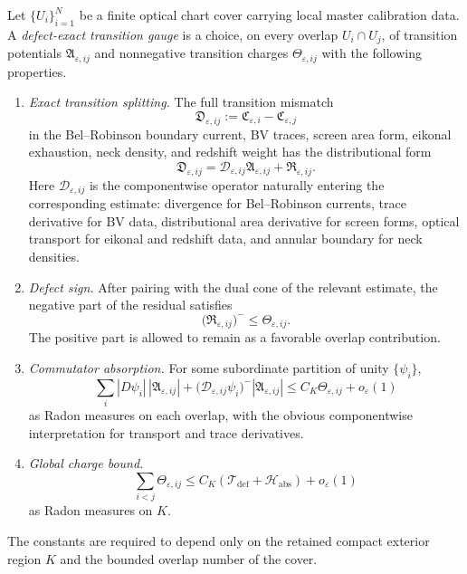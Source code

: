 \begin{definition}\label{def:DefectExactTransitionGauge}
Let $\{U_i\}_{i=1}^N$ be a finite optical chart cover carrying local master calibration data. A \emph{defect-exact transition gauge} is a choice, on every overlap $U_i\cap U_j$, of transition potentials $\mathfrak A_{\varepsilon,ij}$ and nonnegative transition charges $\Theta_{\varepsilon,ij}$ with the following properties.
\begin{enumerate}
    \item \emph{Exact transition splitting.} The full transition mismatch
    \[
        \mathfrak D_{\varepsilon,ij}
        :=
        \mathfrak C_{\varepsilon,i}-\mathfrak C_{\varepsilon,j}
    \]
    in the Bel--Robinson boundary current, BV traces, screen area form, eikonal exhaustion, neck density, and redshift weight has the distributional form
    \[
        \mathfrak D_{\varepsilon,ij}
        =
        \mathscr D_{\varepsilon,ij}\mathfrak A_{\varepsilon,ij}
        +
        \mathfrak R_{\varepsilon,ij}.
    \]
    Here $\mathscr D_{\varepsilon,ij}$ is the componentwise operator naturally entering the corresponding estimate: divergence for Bel--Robinson currents, trace derivative for BV data, distributional area derivative for screen forms, optical transport for eikonal and redshift data, and annular boundary for neck densities.
    \item \emph{Defect sign.} After pairing with the dual cone of the relevant estimate, the negative part of the residual satisfies
    \[
        \bigl(\mathfrak R_{\varepsilon,ij}\bigr)^-
        \le
        \Theta_{\varepsilon,ij}.
    \]
    The positive part is allowed to remain as a favorable overlap contribution.
    \item \emph{Commutator absorption.} For some subordinate partition of unity $\{\psi_i\}$,
    \[
        \sum_i |D\psi_i|\,|\mathfrak A_{\varepsilon,ij}|
        +
        \bigl(\mathscr D_{\varepsilon,ij}\psi_i\bigr)^-|\mathfrak A_{\varepsilon,ij}|
        \le
        C_K\Theta_{\varepsilon,ij}+o_\varepsilon(1)
    \]
    as Radon measures on each overlap, with the obvious componentwise interpretation for transport and trace derivatives.
    \item \emph{Global charge bound.}
    \[
        \sum_{i<j}\Theta_{\varepsilon,ij}
        \le
        C_K\left(\mathcal T_{\mathrm{def}}+\mathcal H_{\mathrm{abs}}\right)
        +o_\varepsilon(1)
    \]
    as Radon measures on $K$.
\end{enumerate}
The constants are required to depend only on the retained compact exterior region $K$ and the bounded overlap number of the cover.
\end{definition}

